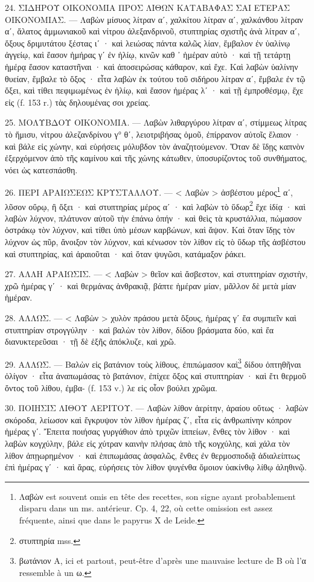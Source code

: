 \documentclass[a4paper, 11pt, oneside, polutonikogreek, french]{article}
\begin{document}
24. ΣΙΔΗΡΟΥ ΟΙΚΟΝΟΜΙΑ ΠΡΟΣ ΛΙΘΩΝ ΚΑΤΑΒΑΦΑΣ ΣΑΙ ΕΤΕΡΑΣ ΟΙΚΟΝΟΜΙΑΣ. --- Λαβὼν μίσυος λίτραν αʹ, χαλκίτου λίτραν αʹ, χαλκάνθου λίτραν αʹ, ἅλατος ἀμμωνιακοῦ καὶ νίτρου ἀλεξανδρινοῦ, στυπτηρίας σχιστῆς ἀνὰ λίτραν αʹ, ὄξους δριμυτάτου ξέστας ιʹ · καὶ λειώσας πάντα καλῶς λίαν, ἔμβαλον ἐν ὑαλίνῳ ἀγγείῳ, καὶ ἔασον ἡμήρας γʹ ἐν ἡλίῳ, κινῶν καθ ᾽ ἡμέραν αὐτὸ · καὶ τῇ τετάρτῃ ἡμέρᾳ ἔασον καταστῆναι · καὶ ἀποσειρώσας κάθαρον, καὶ ἔχε. Καὶ λαβὼν ὑαλίνην θυείαν, ἔμβαλε τὸ ὄξος · εἶτα λαβὼν ἐκ τούτου τοῦ σιδήρου λίτραν αʹ, ἔμβαλε ἐν τῷ ὄξει, καὶ τίθει πεφιμωμένως ἐν ἡλίῳ, καὶ ἔασον ἡμέρας λʹ · καὶ τῇ ἐμπροθέσμῳ, ἔχε εἰς (f. 153 r.) τὰς δηλουμένας σοι χρείας.

25. ΜΟΛΥΒΔΟΥ ΟΙΚΟΝΟΜΙΑ. --- Λαβὼν λιθαργύρου λίτραν αʹ, στίμμεως λίτρας τὸ ἥμισυ, νίτρου ἀλεζανδρίνου γ° θʹ, λειοτριβήσας ὁμοῦ, ἐπίρρανον αὐτοῖς ἔλαιον · καὶ βάλε εἰς χώνην, καὶ εὑρήσεις μόλυβδον τὸν ἀναζητούμενον. Ὅταν δὲ ἴδῃς καπνὸν ἐξερχόμενον ἀπὸ τῆς καμίνου καὶ τῆς χώνης κάτωθεν, ὑποσυρίζοντος τοῦ συνθήματος, νόει ὡς κατεσπάσθη.

26. ΠΕΡΙ ΑΡΑΙΩΣΕΩΣ ΚΡΥΣΤΑΛΛΟΥ. --- < Λαβὼν > ἀσβέστου μέρος\footnote{Λαβὼν est souvent omis en tête des recettes, son signe ayant probablement disparu dans un ms. antérieur. Cp. 4, 22, où cette omission est assez fréquente, ainsi que dans le papyrus X de Leide.} αʹ, λῦσον οὔρῳ, ἢ ὄξει · καὶ στυπτηρίας μέρος αʹ · καὶ λαβὼν τὸ ὕδωρ\footnote{στυπτηρία mss.} ἔχε ἰδίᾳ · καὶ λαβὼν λύχνον, πλάτυνον αὐτοῦ τὴν ἐπάνω ὀπήν · καὶ θεὶς τὰ κρυστάλλια, πώμασον ὀστράκῳ τὸν λύχνον, καὶ τίθει ὑπὸ μέσων καρβώνων, καὶ ἅψον. Καὶ ὅταν ἴδῃς τὸν λύχνον ὡς πῦρ, ἄνοιξον τὸν λύχνον, καὶ κένωσον τὸν λίθον εἰς τὸ ὕδωρ τῆς ἀσβέστου καὶ στυπτηρίας, καὶ ἀραιοῦται · καὶ ὅταν ψυγῶσι, κατάμαξον ῥάκει.

27. ΑΛΛΗ ΑΡΑΙΩΣΙΣ. --- < Λαβὼν > θεῖον καὶ ἄσβεστον, καὶ στυπτηρίαν σχιστὴν, χρῶ ἡμέρας γʹ · καὶ θερμάνας ἀνθρακιᾷ, βάπτε ἡμέραν μίαν, μᾶλλον δὲ μετὰ μίαν ἡμέραν.

28. ΑΛΛΩΣ. --- < Λαβὼν > χυλὸν πράσου μετὰ ὄξους, ἡμέρας γʹ ἔα συμπιεῖν καὶ στυπτηρίαν στρογγύλην · καὶ βαλὼν τὸν λίθον, δίδου βράσματα δύο, καὶ ἔα διανυκτερεῦσαι · τῇ δὲ ἑξῆς ἀπόκλυζε, καὶ χρῶ.

29. ΑΛΛΩΣ. --- Βαλὼν εἰς βατάνιον τοὺς λίθους, ἐπιπώμασον καὶ\footnote{βωτάνιον A, ici et partout, peut-être d'après une mauvaise lecture de B où l'α ressemble à un ω.} δίδου ὀπτηθῆναι ὀλίγον · εἶτα ἀναπωμάσας τὸ βατάνιον, ἐπίχεε ὄξος καὶ στυπτηρίαν · καὶ ἔτι θερμοῦ ὄντος τοῦ λίθου, ἐμβα- (f. 153 v.) λε εἰς οἷον βούλει χρῶμα.

30. ΠΟΙΗΣΙΣ ΛΙΘΟΥ ΑΕΡΙΤΟΥ. --- Λαβὼν λίθον ἀερίτην, ἀραίου οὕτως · λαβὼν σκόροδα, λείωσον καὶ ἔγκρυψον τὸν λίθον ἡμέρας ζʹ, εἶτα εἰς ἀνθρωπίνην κόπρον ἡμέρας γʹ. Ἔπειτα ποιήσας γυργάθιον ἀπὸ τριχῶν ἱππείων, ἔνθες τὸν λίθον · καὶ λαβὼν κογχύλην, βάλε εἰς χύτραν καινὴν πλήσας ἀπὸ τῆς κογχύλης, καὶ χάλα τὸν λίθον ἀπῃωρημένον · καὶ ἐπιπωμάσας ἀσφαλῶς, ἔνθες ἐν θερμοσποδιᾷ ἀδιαλείπτως ἐπὶ ἡμέρας γʹ · καὶ ἄρας, εὑρήσεις τὸν λίθον ψυγένθα ὅμοιον ὑακίνθῳ λίθῳ ἀληθινῷ.
\end{document}
